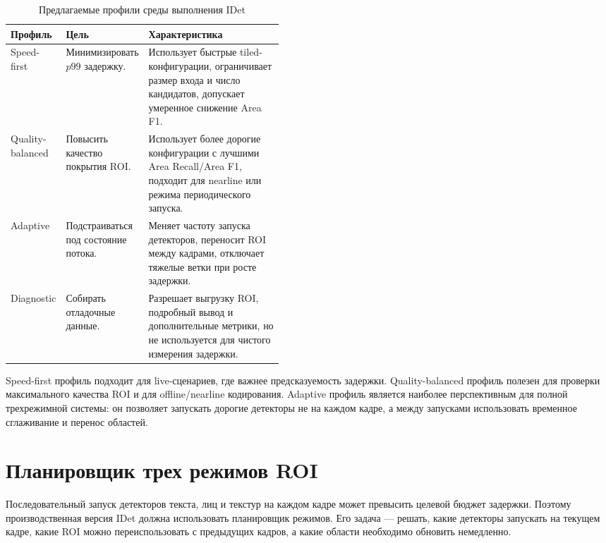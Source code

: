 \documentclass[12pt,a4paper,oneside,openany]{report}
\begin{document}
\begin{table}[H]\centering\caption{Предлагаемые профили среды выполнения IDet}\label{tab:runtime_profiles}\small\begin{tabularx}{\linewidth}{@{}P{0.20\linewidth}P{0.25\linewidth}Y@{}}\toprule
Профиль & Цель & Характеристика \\
\midrule
Speed-first & Минимизировать $p99$ задержку. & Использует быстрые tiled-конфигурации, ограничивает размер входа и число кандидатов, допускает умеренное снижение Area F1. \\
Quality-balanced & Повысить качество покрытия ROI. & Использует более дорогие конфигурации с лучшими Area Recall/Area F1, подходит для nearline или режима периодического запуска. \\
Adaptive & Подстраиваться под состояние потока. & Меняет частоту запуска детекторов, переносит ROI между кадрами, отключает тяжелые ветки при росте задержки. \\
Diagnostic & Собирать отладочные данные. & Разрешает выгрузку ROI, подробный вывод и дополнительные метрики, но не используется для чистого измерения задержки. \\
\bottomrule\end{tabularx}
\end{table}

Speed-first профиль подходит для live-сценариев, где важнее предсказуемость задержки. Quality-balanced профиль полезен для проверки максимального качества ROI и для offline/nearline кодирования. Adaptive профиль является наиболее перспективным для полной трехрежимной системы: он позволяет запускать дорогие детекторы не на каждом кадре, а между запусками использовать временное сглаживание и перенос областей.


\section{Планировщик трех режимов ROI}

Последовательный запуск детекторов текста, лиц и текстур на каждом кадре может превысить целевой бюджет задержки. Поэтому производственная версия IDet должна использовать планировщик режимов. Его задача --- решать, какие детекторы запускать на текущем кадре, какие ROI можно переиспользовать с предыдущих кадров, а какие области необходимо обновить немедленно.
\end{document}
